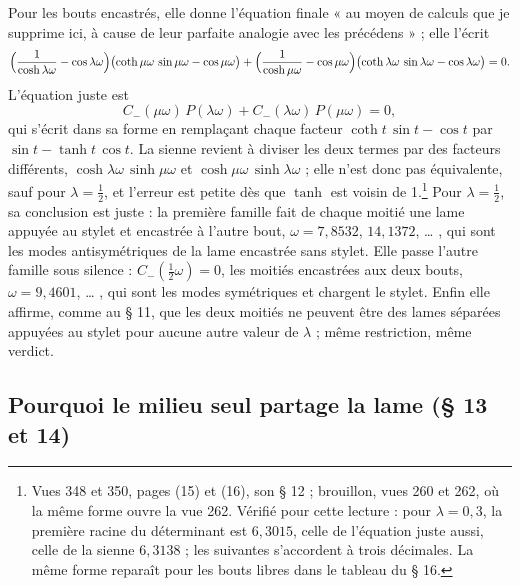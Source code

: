 \documentclass[11pt,a4paper]{article}
\begin{document}
Pour les bouts encastrés, elle donne l'équation finale « au moyen de calculs que je supprime ici, à cause de leur parfaite analogie avec les précédens » ; elle l'écrit
\[
\Bigl(\frac{1}{\cosh\lambda\omega}-\cos\lambda\omega\Bigr)\bigl(\coth\mu\omega\,\sin\mu\omega-\cos\mu\omega\bigr)
+\Bigl(\frac{1}{\cosh\mu\omega}-\cos\mu\omega\Bigr)\bigl(\coth\lambda\omega\,\sin\lambda\omega-\cos\lambda\omega\bigr)=0 .
\]
L'équation juste est
\[
C_{-}(\mu\omega)\,P(\lambda\omega)+C_{-}(\lambda\omega)\,P(\mu\omega)=0,
\]
qui s'écrit dans sa forme en remplaçant chaque facteur $\coth t\,\sin t-\cos t$ par $\sin t-\tanh t\,\cos t$. La sienne revient à diviser les deux termes par des facteurs différents, $\cosh\lambda\omega\,\sinh\mu\omega$ et $\cosh\mu\omega\,\sinh\lambda\omega$ ; elle n'est donc pas équivalente, sauf pour $\lambda=\frac12$, et l'erreur est petite dès que $\tanh$ est voisin de 1.\footnote{Vues 348 et 350, pages (15) et (16), son § 12 ; brouillon, vues 260 et 262, où la même forme ouvre la vue 262. Vérifié pour cette lecture : pour $\lambda=0{,}3$, la première racine du déterminant est $6{,}3015$, celle de l'équation juste aussi, celle de la sienne $6{,}3138$ ; les suivantes s'accordent à trois décimales. La même forme reparaît pour les bouts libres dans le tableau du § 16.} Pour $\lambda=\frac12$, sa conclusion est juste : la première famille fait de chaque moitié une lame appuyée au stylet et encastrée à l'autre bout, $\omega=7{,}8532$, $14{,}1372$, … , qui sont les modes antisymétriques de la lame encastrée sans stylet. Elle passe l'autre famille sous silence : $C_{-}(\frac12\omega)=0$, les moitiés encastrées aux deux bouts, $\omega=9{,}4601$, … , qui sont les modes symétriques et chargent le stylet. Enfin elle affirme, comme au § 11, que les deux moitiés ne peuvent être des lames séparées appuyées au stylet pour aucune autre valeur de $\lambda$ ; même restriction, même verdict.

\subsection*{Pourquoi le milieu seul partage la lame (§ 13 et 14)}
\end{document}
